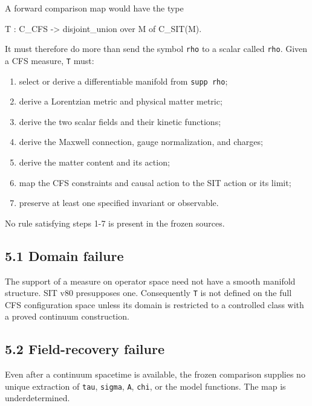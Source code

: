 \documentclass[
  american,
  11pt,
  letterpaper,
]{article}
\newenvironment{Shaded}{}{}
\newcommand{\NormalTok}[1]{#1}
\providecommand{\tightlist}{%
  \setlength{\itemsep}{0pt}\setlength{\parskip}{0pt}}
\begin{document}
A forward comparison map would have the type

\begin{Shaded}
\begin{Highlighting}[]
\NormalTok{T : C\_CFS {-}\textgreater{} disjoint\_union over M of C\_SIT(M).}
\end{Highlighting}
\end{Shaded}

It must therefore do more than send the symbol \texttt{rho} to a scalar called \texttt{rho}. Given a CFS measure, \texttt{T} must:

\begin{enumerate}
\def\labelenumi{\arabic{enumi}.}
\tightlist
\item
  select or derive a differentiable manifold from \texttt{supp\ rho};
\item
  derive a Lorentzian metric and physical matter metric;
\item
  derive the two scalar fields and their kinetic functions;
\item
  derive the Maxwell connection, gauge normalization, and charges;
\item
  derive the matter content and its action;
\item
  map the CFS constraints and causal action to the SIT action or its limit;
\item
  preserve at least one specified invariant or observable.
\end{enumerate}

No rule satisfying steps 1-7 is present in the frozen sources.

\subsection{5.1 Domain failure}\label{domain-failure}

The support of a measure on operator space need not have a smooth manifold structure. SIT v80 presupposes one. Consequently \texttt{T} is not defined on the full CFS configuration space unless its domain is restricted to a controlled class with a proved continuum construction.

\subsection{5.2 Field-recovery failure}\label{field-recovery-failure}

Even after a continuum spacetime is available, the frozen comparison supplies no unique extraction of \texttt{tau}, \texttt{sigma}, \texttt{A}, \texttt{chi}, or the model functions. The map is underdetermined.
\end{document}

